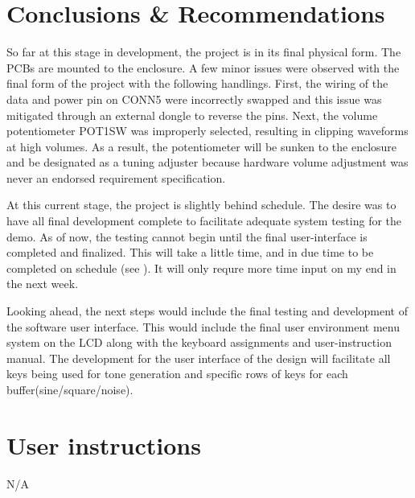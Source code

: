 \documentclass[bibtotocnumbered,abstract=on,paper=a4,fontsize=12pt,parskip=on,halfparskip=on]{scrartcl}		%
\begin{document}
  \section{Conclusions \& Recommendations}
 
 So far at this stage in development, the project is in its final physical form. The PCBs are mounted to the enclosure. A few minor issues were observed with the final form of the project with the following handlings. First, the wiring of the data and power pin on CONN5 were incorrectly swapped and this issue was mitigated through an external dongle to reverse the pins. Next, the volume potentiometer POT1SW was improperly selected, resulting in clipping waveforms at high volumes. As a result, the potentiometer will be sunken to the enclosure and be designated as a tuning adjuster because hardware volume adjustment was never an endorsed requirement specification. 

At this current stage, the project is slightly behind schedule. The desire was to have all final development complete to facilitate adequate system testing for the demo. As of now, the testing cannot begin until the final user-interface is completed and finalized. This will take a little time, and in due time to be completed on schedule (see ). It will only requre more time input on my end in the next week.

Looking ahead, the next steps would include the final testing and development of the software user interface. This would include the final user environment menu system on the LCD along with the keyboard assignments and user-instruction manual. The development for the user interface of the design will facilitate all keys being used for tone generation and specific rows of keys for each buffer(sine/square/noise).
  \clearpage
    
\newpage


\newpage
\appendix
\appendixpage
\addappheadtotoc
\section{User instructions}
N/A
  \clearpage
\end{document}

